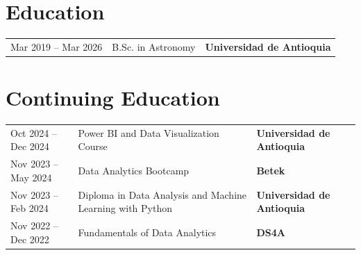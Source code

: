\documentclass[a4paper, 10pt]{article}
\begin{document}
\section{Education}
\begin{tabularx}{\linewidth}{@{}l X@{} l@{}}	
Mar 2019 -- Mar 2026 & B.Sc. in Astronomy & \textbf{Universidad de Antioquia} \hfill \normalsize \\
\end{tabularx}

\section{Continuing Education}
\begin{tabularx}{\linewidth}{@{}l X@{} l@{}}

Oct 2024 -- Dec 2024 & Power BI and Data Visualization Course & 
\textbf{Universidad de Antioquia} \hfill \normalsize \\

Nov 2023 -- May 2024 & Data Analytics Bootcamp & \textbf{Betek} \hfill \normalsize \\

Nov 2023 -- Feb 2024 & Diploma in Data Analysis and Machine Learning with Python & \textbf{Universidad de Antioquia} \hfill \normalsize \\

Nov 2022 -- Dec 2022 & Fundamentals of Data Analytics & \textbf{DS4A} \hfill \normalsize \\
\end{tabularx}

\end{document}
